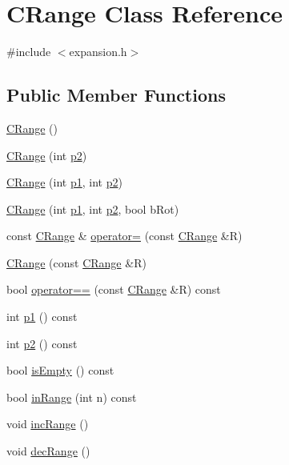 \hypertarget{classCRange}{\section{C\-Range Class Reference}
\label{classCRange}
}


{\ttfamily \#include $<$expansion.\-h$>$}

\subsection*{Public Member Functions}
\begin{DoxyCompactItemize}
\item 
\hyperlink{classCRange_a12bb43c1078b3312943eb4487b216b56}{C\-Range} ()
\item 
\hyperlink{classCRange_a5d07db4ff572c4b5139ad1261a0ff756}{C\-Range} (int \hyperlink{classCRange_a88c073347df45fa05a0e88fd91021d2b}{p2})
\item 
\hyperlink{classCRange_aa3f19739b3afcbc71708458f36c5341f}{C\-Range} (int \hyperlink{classCRange_a300319aff8dd27fefc004b6c724b4655}{p1}, int \hyperlink{classCRange_a88c073347df45fa05a0e88fd91021d2b}{p2})
\item 
\hyperlink{classCRange_a4707c0cdf4ec6f6eb462da9a2d59957a}{C\-Range} (int \hyperlink{classCRange_a300319aff8dd27fefc004b6c724b4655}{p1}, int \hyperlink{classCRange_a88c073347df45fa05a0e88fd91021d2b}{p2}, bool b\-Rot)
\item 
const \hyperlink{classCRange}{C\-Range} \& \hyperlink{classCRange_a6fb1ea1d0fcafbd10537719856df18e3}{operator=} (const \hyperlink{classCRange}{C\-Range} \&R)
\item 
\hyperlink{classCRange_a5a9670bdf5a390163a8fe12114385a17}{C\-Range} (const \hyperlink{classCRange}{C\-Range} \&R)
\item 
bool \hyperlink{classCRange_aed2b0d5257a9b972c242cfc12bc1a9d0}{operator==} (const \hyperlink{classCRange}{C\-Range} \&R) const 
\item 
int \hyperlink{classCRange_a300319aff8dd27fefc004b6c724b4655}{p1} () const 
\item 
int \hyperlink{classCRange_a88c073347df45fa05a0e88fd91021d2b}{p2} () const 
\item 
bool \hyperlink{classCRange_a1bc4be786243482ff5b493933b9906bc}{is\-Empty} () const 
\item 
bool \hyperlink{classCRange_ab634198a2af9e23bc52202ed1df5ad09}{in\-Range} (int n) const 
\item 
void \hyperlink{classCRange_a52a80e221024456c29a2022f9566d181}{inc\-Range} ()
\item 
void \hyperlink{classCRange_a99e330c80b10a04916651662d28ac7ed}{dec\-Range} ()
\end{DoxyCompactItemize}

